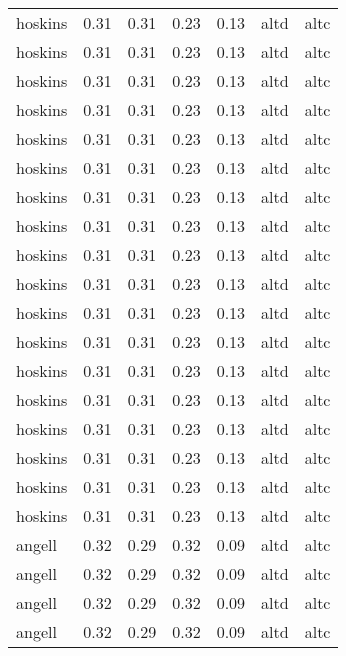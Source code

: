 \begin{tabular}{lrrrrll}
   hoskins &     0.31 &     0.31 &     0.23 &     0.13 &      altd &     altc \\
   hoskins &     0.31 &     0.31 &     0.23 &     0.13 &      altd &     altc \\
   hoskins &     0.31 &     0.31 &     0.23 &     0.13 &      altd &     altc \\
   hoskins &     0.31 &     0.31 &     0.23 &     0.13 &      altd &     altc \\
   hoskins &     0.31 &     0.31 &     0.23 &     0.13 &      altd &     altc \\
   hoskins &     0.31 &     0.31 &     0.23 &     0.13 &      altd &     altc \\
   hoskins &     0.31 &     0.31 &     0.23 &     0.13 &      altd &     altc \\
   hoskins &     0.31 &     0.31 &     0.23 &     0.13 &      altd &     altc \\
   hoskins &     0.31 &     0.31 &     0.23 &     0.13 &      altd &     altc \\
   hoskins &     0.31 &     0.31 &     0.23 &     0.13 &      altd &     altc \\
   hoskins &     0.31 &     0.31 &     0.23 &     0.13 &      altd &     altc \\
   hoskins &     0.31 &     0.31 &     0.23 &     0.13 &      altd &     altc \\
   hoskins &     0.31 &     0.31 &     0.23 &     0.13 &      altd &     altc \\
   hoskins &     0.31 &     0.31 &     0.23 &     0.13 &      altd &     altc \\
   hoskins &     0.31 &     0.31 &     0.23 &     0.13 &      altd &     altc \\
   hoskins &     0.31 &     0.31 &     0.23 &     0.13 &      altd &     altc \\
   hoskins &     0.31 &     0.31 &     0.23 &     0.13 &      altd &     altc \\
   hoskins &     0.31 &     0.31 &     0.23 &     0.13 &      altd &     altc \\
    angell &     0.32 &     0.29 &     0.32 &     0.09 &      altd &     altc \\
    angell &     0.32 &     0.29 &     0.32 &     0.09 &      altd &     altc \\
    angell &     0.32 &     0.29 &     0.32 &     0.09 &      altd &     altc \\
    angell &     0.32 &     0.29 &     0.32 &     0.09 &      altd &     altc \\

\end{tabular}
